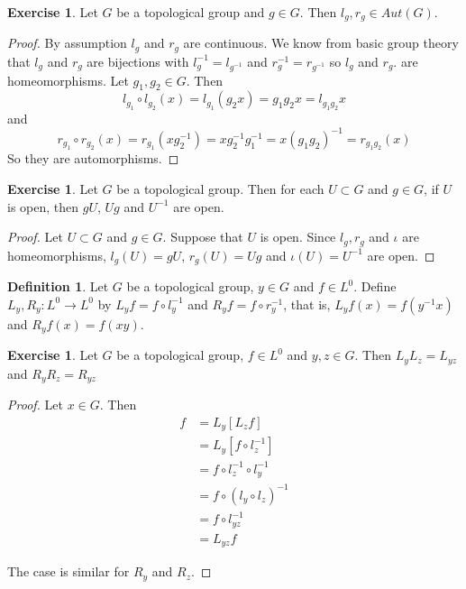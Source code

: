 \documentclass[12pt]{amsart}
\theoremstyle{definition}
\newtheorem{defn}[definition]{Definition}
\newtheorem{ex}[definition]{Exercise}
\begin{document}
	\begin{ex}
		Let $G$ be a topological group and $g \in G$. Then $l_g, r_g \in Aut(G)$.
	\end{ex}
	
	\begin{proof}
		By assumption $l_g$ and $r_g$ are continuous. We know from basic group theory that $l_g$ and $r_g$ are bijections with $l_g^{-1} = l_{g^{-1}}$ and $r_g^{-1} = r_{g^{-1}}$ so $l_g$ and $r_g$. are homeomorphisms. Let $g_1, g_2 \in G$. Then $$l_{g_1} \circ l_{g_2}(x) = l_{g_1}(g_2 x) = g_1 g_2 x= l_{g_1 g_2}x$$ and $$r_{g_1} \circ r_{g_2} (x) = r_{g_1}(x g_2^{-1})= xg_2^{-1}g_1^{-1} = x(g_1g_2)^{-1} = r_{g_1g_2}(x)$$ So they are automorphisms. 
	\end{proof}
	
	\begin{ex}
		Let $G$ be a topological group. Then for each $U \subset G$ and $g \in G$, if $U$ is open, then $gU$, $Ug$ and $U^{-1}$ are open. 
	\end{ex}
	\begin{proof}
		Let $U \subset G$ and $g \in G$. Suppose that $U$ is open. Since $l_g, r_g$ and $\iota$ are homeomorphisms, $l_g(U) = gU$, $r_g(U) = Ug$ and $\iota(U) = U^{-1}$ are open. 
	\end{proof}
	
	\begin{defn}
		Let $G$ be a topological group, $y \in G$ and $f \in L^0$.  Define $L_y, R_y: L^0 \rightarrow L^0$ by $L_y f = f \circ l_y^{-1}$ and $R_y f = f \circ r_y^{-1}$, that is, $L_yf(x) = f(y^{-1}x)$ and $R_yf(x) = f(xy)$.
	\end{defn}
	
	\begin{ex}
		Let $G$ be a topological group, $f \in L^0$ and $y,z \in G$. Then $L_yL_z = L_{yz}$ and $R_yR_z = R_{yz}$
	\end{ex}

	\begin{proof}
		Let $x \in G$. Then 
		\begin{align*}
			[L_yL_z]f
			& = L_y [L_z f]  \\
			& = L_y [f \circ l_z^{-1}]  \\
			& = f \circ l_z^{-1} \circ l_y^{-1} \\
			& = f \circ (l_y \circ l_z)^{-1}  \\
			& = f \circ l_{yz}^{-1} \\
			&= L_{yz} f
		\end{align*}
		
		The case is similar for $R_y$ and $ R_z$.
	\end{proof}
	
\end{document}
